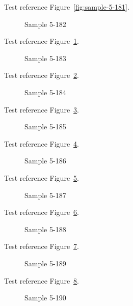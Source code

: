 Test reference Figure~\ref{fig:sample-5-181}.

\begin{figure}[tbhp]
\caption{Sample 5-182}
\label{fig:sample-5-182}
\end{figure}

Test reference Figure~\ref{fig:sample-5-182}.

\begin{figure}[tbhp]
\caption{Sample 5-183}
\label{fig:sample-5-183}
\end{figure}

Test reference Figure~\ref{fig:sample-5-183}.

\begin{figure}[tbhp]
\caption{Sample 5-184}
\label{fig:sample-5-184}
\end{figure}

Test reference Figure~\ref{fig:sample-5-184}.

\begin{figure}[tbhp]
\caption{Sample 5-185}
\label{fig:sample-5-185}
\end{figure}

Test reference Figure~\ref{fig:sample-5-185}.

\begin{figure}[tbhp]
\caption{Sample 5-186}
\label{fig:sample-5-186}
\end{figure}

Test reference Figure~\ref{fig:sample-5-186}.

\begin{figure}[tbhp]
\caption{Sample 5-187}
\label{fig:sample-5-187}
\end{figure}

Test reference Figure~\ref{fig:sample-5-187}.

\begin{figure}[tbhp]
\caption{Sample 5-188}
\label{fig:sample-5-188}
\end{figure}

Test reference Figure~\ref{fig:sample-5-188}.

\begin{figure}[tbhp]
\caption{Sample 5-189}
\label{fig:sample-5-189}
\end{figure}

Test reference Figure~\ref{fig:sample-5-189}.

\begin{figure}[tbhp]
\caption{Sample 5-190}
\label{fig:sample-5-190}
\end{figure}

